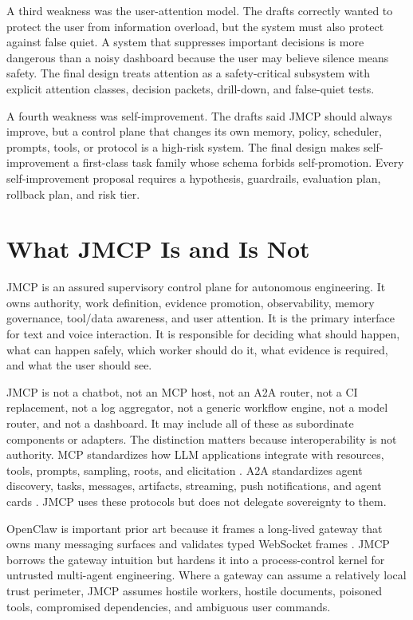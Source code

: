 \documentclass[10pt,journal,onecolumn]{IEEEtran}
\begin{document}
A third weakness was the user-attention model. The drafts correctly wanted to protect the user from information overload, but the system must also protect against false quiet. A system that suppresses important decisions is more dangerous than a noisy dashboard because the user may believe silence means safety. The final design treats attention as a safety-critical subsystem with explicit attention classes, decision packets, drill-down, and false-quiet tests.

A fourth weakness was self-improvement. The drafts said JMCP should always improve, but a control plane that changes its own memory, policy, scheduler, prompts, tools, or protocol is a high-risk system. The final design makes self-improvement a first-class task family whose schema forbids self-promotion. Every self-improvement proposal requires a hypothesis, guardrails, evaluation plan, rollback plan, and risk tier.

\section{What JMCP Is and Is Not}
JMCP is an assured supervisory control plane for autonomous engineering. It owns authority, work definition, evidence promotion, observability, memory governance, tool/data awareness, and user attention. It is the primary interface for text and voice interaction. It is responsible for deciding what should happen, what can happen safely, which worker should do it, what evidence is required, and what the user should see.

JMCP is not a chatbot, not an MCP host, not an A2A router, not a CI replacement, not a log aggregator, not a generic workflow engine, not a model router, and not a dashboard. It may include all of these as subordinate components or adapters. The distinction matters because interoperability is not authority. MCP standardizes how LLM applications integrate with resources, tools, prompts, sampling, roots, and elicitation \cite{mcp}. A2A standardizes agent discovery, tasks, messages, artifacts, streaming, push notifications, and agent cards \cite{a2a}. JMCP uses these protocols but does not delegate sovereignty to them.

OpenClaw is important prior art because it frames a long-lived gateway that owns many messaging surfaces and validates typed WebSocket frames \cite{openclaw}. JMCP borrows the gateway intuition but hardens it into a process-control kernel for untrusted multi-agent engineering. Where a gateway can assume a relatively local trust perimeter, JMCP assumes hostile workers, hostile documents, poisoned tools, compromised dependencies, and ambiguous user commands.
\end{document}
